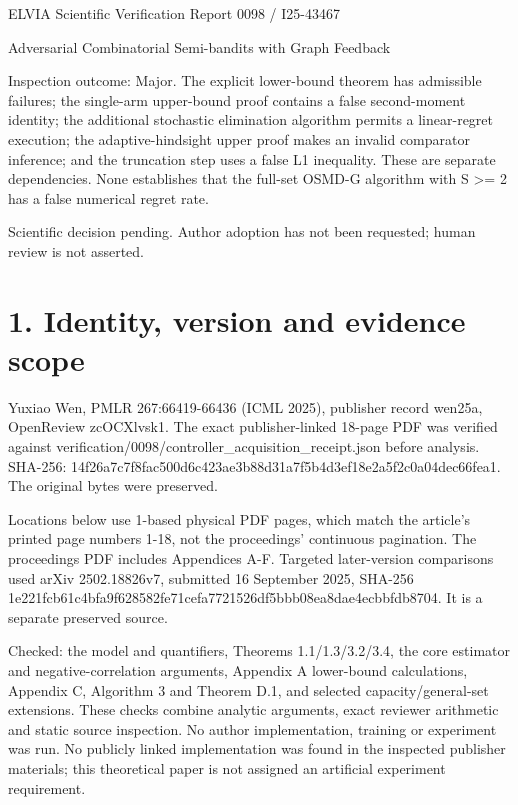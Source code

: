 \documentclass[10pt]{article}
\begin{document}
ELVIA Scientific Verification Report
0098 / I25-43467\par
Adversarial Combinatorial Semi-bandits with Graph Feedback\par
Inspection outcome: Major. The explicit lower-bound theorem has admissible failures; the single-arm upper-bound proof contains a false second-moment identity; the additional stochastic elimination algorithm permits a linear-regret execution; the adaptive-hindsight upper proof makes an invalid comparator inference; and the truncation step uses a false L1 inequality. These are separate dependencies. None establishes that the full-set OSMD-G algorithm with S >= 2 has a false numerical regret rate.\par
Scientific decision pending. Author adoption has not been requested; human review is not asserted.\par
\section*{1. Identity, version and evidence scope}
Yuxiao Wen, PMLR 267:66419-66436 (ICML 2025), publisher record wen25a, OpenReview zcOCXlvsk1. The exact publisher-linked 18-page PDF was verified against verification/0098/controller\_acquisition\_receipt.json before analysis. SHA-256: 14f26a7c7f8fac500d6c423ae3b88d31a7f5b4d3ef18e2a5f2c0a04dec66fea1. The original bytes were preserved.\par
Locations below use 1-based physical PDF pages, which match the article’s printed page numbers 1-18, not the proceedings’ continuous pagination. The proceedings PDF includes Appendices A-F. Targeted later-version comparisons used arXiv 2502.18826v7, submitted 16 September 2025, SHA-256 1e221fcb61c4bfa9f628582fe71cefa7721526df5bbb08ea8dae4ecbbfdb8704. It is a separate preserved source.\par
Checked: the model and quantifiers, Theorems 1.1/1.3/3.2/3.4, the core estimator and negative-correlation arguments, Appendix A lower-bound calculations, Appendix C, Algorithm 3 and Theorem D.1, and selected capacity/general-set extensions. These checks combine analytic arguments, exact reviewer arithmetic and static source inspection. No author implementation, training or experiment was run. No publicly linked implementation was found in the inspected publisher materials; this theoretical paper is not assigned an artificial experiment requirement.\par
\end{document}
